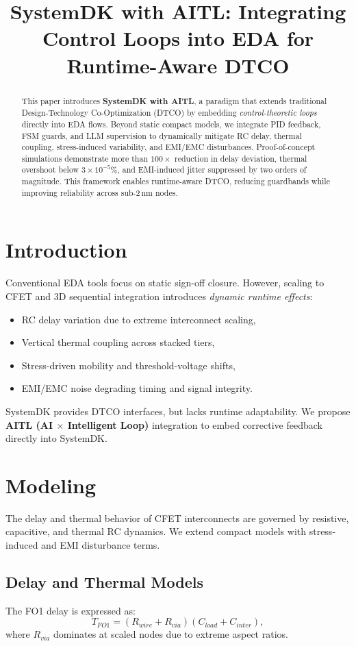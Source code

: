\documentclass[conference]{IEEEtran}
\title{SystemDK with AITL: Integrating Control Loops into EDA for Runtime-Aware DTCO}
\author{
  \IEEEauthorblockN{Shinichi Samizo}
  \IEEEauthorblockA{Independent Semiconductor Researcher\\
  Email: \href{mailto:shin3t72@gmail.com}{shin3t72@gmail.com}}
}
\begin{document}
\maketitle

\begin{abstract}
This paper introduces \textbf{SystemDK with AITL}, a paradigm that extends 
traditional Design-Technology Co-Optimization (DTCO) by embedding 
\emph{control-theoretic loops} directly into EDA flows. 
Beyond static compact models, we integrate PID feedback, FSM guards, 
and LLM supervision to dynamically mitigate RC delay, thermal coupling, 
stress-induced variability, and EMI/EMC disturbances. 
Proof-of-concept simulations demonstrate more than $100\times$ reduction in delay deviation,
thermal overshoot below $3\times 10^{-5}\%$, and EMI-induced jitter suppressed by two orders of magnitude. 
This framework enables runtime-aware DTCO, reducing guardbands while improving reliability across sub-2\,nm nodes.
\end{abstract}

\section{Introduction}
Conventional EDA tools focus on static sign-off closure. 
However, scaling to CFET and 3D sequential integration introduces \emph{dynamic runtime effects}:
\begin{itemize}
  \item RC delay variation due to extreme interconnect scaling,
  \item Vertical thermal coupling across stacked tiers,
  \item Stress-driven mobility and threshold-voltage shifts,
  \item EMI/EMC noise degrading timing and signal integrity.
\end{itemize}
SystemDK provides DTCO interfaces, but lacks runtime adaptability.
We propose \textbf{AITL (AI $\times$ Intelligent Loop)} integration to embed corrective feedback directly into SystemDK.

\section{Modeling}
The delay and thermal behavior of CFET interconnects are governed by resistive,
capacitive, and thermal RC dynamics. We extend compact models with
stress-induced and EMI disturbance terms.

\subsection{Delay and Thermal Models}
The FO1 delay is expressed as:
\begin{equation}
T_{FO1} = (R_{wire}+R_{via})(C_{load}+C_{inter}),
\end{equation}
where $R_{via}$ dominates at scaled nodes due to extreme aspect ratios.  
\end{document}
